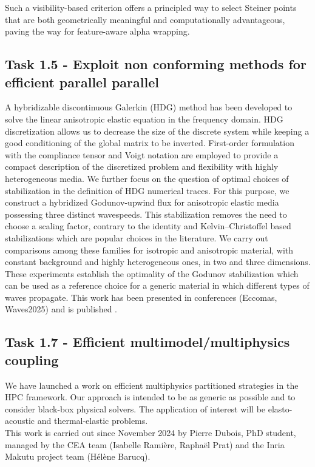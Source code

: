Such a visibility-based criterion offers a principled way to select Steiner points that are both geometrically meaningful and computationally advantageous, paving the way for feature-aware alpha wrapping.

\subsection{Task 1.5 - Exploit non conforming methods for efficient parallel parallel}
A hybridizable discontinuous Galerkin (HDG) method has been developed to solve the linear anisotropic elastic equation in the frequency domain. HDG discretization allows us to decrease the size of the discrete system while keeping a good conditioning of the global matrix to be inverted. First-order formulation with the compliance tensor and Voigt notation are employed to provide a compact description of the discretized problem and flexibility with highly heterogeneous media. We further focus on the question of optimal choices of stabilization in the definition of HDG numerical traces. For this purpose, we construct a hybridized Godunov-upwind flux for anisotropic elastic media possessing three distinct wavespeeds. This stabilization removes the need to choose a scaling factor, contrary to the identity and Kelvin–Christoffel based stabilizations which are popular choices in the literature. We carry out comparisons among these families for isotropic and anisotropic material, with constant background and highly heterogeneous ones, in two and three dimensions. These experiments establish the optimality of the Godunov stabilization which can be used as a reference choice for a generic material in which different types of waves propagate. This work has been presented in conferences (Eccomas, Waves2025) and is published \cite{pham_numerical_2024}.

\subsection{Task 1.7 -  Efficient multimodel/multiphysics coupling}
We have launched a work on efficient multiphysics partitioned strategies in the HPC framework. Our approach is intended to be as generic as possible and to consider black-box physical solvers. The application of interest will be elasto-acoustic and thermal-elastic problems.\\
This work is carried out since November 2024 by Pierre Dubois, PhD student, managed by the CEA team (Isabelle Ramière, Raphaël Prat) and the Inria Makutu project team (Hélène Barucq).

